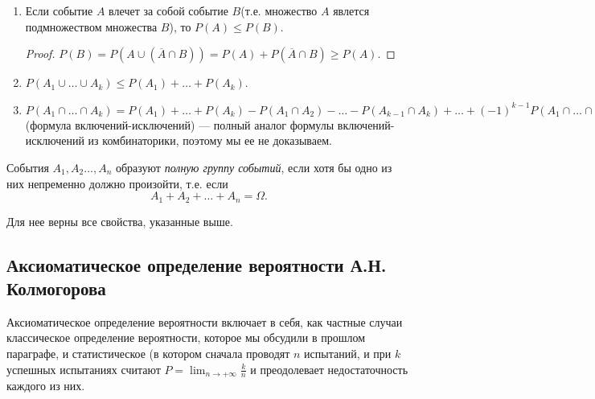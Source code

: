 \begin{enumerate}
\item
Если событие $A$ влечет за собой событие $B$(т.е. множество $A$ явлется подмножеством множества $B$), то $P(A)\le P(B)$.
\begin{proof}
$P(B)=P(A\cup (\overline{A}\cap B))=P(A)+P(\overline{A}\cap B)\ge P(A).$
\end{proof}

\item
$P(A_1\cup\dots\cup A_k) \le P(A_1)+\dots+P(A_k)$.

\item
$P(A_1\cap\dots\cap A_k)= P(A_1)+\dots+P(A_k)-P(A_1\cap A_2)-\dots -P(A_{k-1}\cap A_{k})+ \dots + (-1)^{k-1}P(A_1\cap\dots\cap A_k)  $ (формула включений-исключений) --- полный аналог формулы включений-исключений из комбинаторики, поэтому мы ее не доказываем.
\end{enumerate}

\begin{defn}
События $A_1,A_2\dots,A_n$ образуют \textit{полную группу событий}, если хотя бы одно из них непременно должно произойти, т.е. если
$$
A_1+A_2+\dots+A_n=\Omega.
$$
\end{defn}
Для нее верны все свойства, указанные выше.

\subsection{Аксиоматическое определение вероятности А.Н. Колмогорова}

Аксиоматическое определение вероятности включает в себя, как частные случаи классическое определение вероятности, которое мы обсудили в прошлом параграфе, и статистическое (в котором сначала проводят $n$ испытаний, и при $k$ успешных испытаниях считают $P=\lim_{n \to +\infty}\limits\frac{k}{n}$ и преодолевает недостаточность каждого из них.

